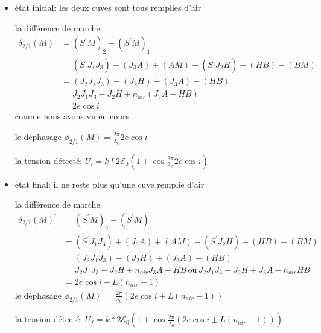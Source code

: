\documentclass[a4paper,12pt]{book}
\begin{document}
\begin{itemize}
    \item état initial: les deux cuves sont tous remplies d'air
          
    la différence de marche:
          \begin{align*}
            \delta_{2/1}(M)&=(S^{'}M)_2-(S^{'}M)_1\\
                           &=(S^{'}J_1J_3)+(J_3A)+(AM)-(S^{'}J_2H)-(HB)-(BM)\\
                           &=(J_2J_1J_3)-(J_2H)+(J_3A)-(HB)\\
                           &=J_2J_1J_3-J_2H+n_{air}(J_3A-HB)\\
                           &=2e\cos{i}
          \end{align*}
          comme nous avons vu en cours.

    le déphasage $\phi_{2/1}(M)=\frac{2\pi}{\lambda_0}2e\cos{i}$

    la tension détecté: $U_{i}=k*2\mathcal{E}_0\left(1+\cos \frac{2\pi}{\lambda_0}2e\cos{i}\right)$

    \item état final: il ne reste plus qu'une cuve remplie d'air
          
    la différence de marche:
          \begin{align*}
            \delta_{2/1}(M)^{'}&=(S^{'}M)_2-(S^{'}M)_1\\
                           &=(S^{'}J_1J_3)+(J_3A)+(AM)-(S^{'}J_2H)-(HB)-(BM)\\
                           &=(J_2J_1J_3)-(J_2H)+(J_3A)-(HB)\\
                           &=J_2J_1J_3-J_2H+n_{air}J_3A-HB\,\mbox{ou}\,J_2J_1J_3-J_2H+J_3A-n_{air}HB\\
                           &=2e\cos{i}\pm L(n_{air}-1)
          \end{align*}
    le déphasage $\phi_{2/1}(M)^{'}=\frac{2\pi}{\lambda_0}(2e\cos{i}\pm L(n_{air}-1))$

    la tension détecté: $U_{f}=k*2\mathcal{E}_0\left(1+\cos \frac{2\pi}{\lambda_0}(2e\cos{i}\pm L(n_{air}-1))\right)$
\end{itemize}
\end{document}
